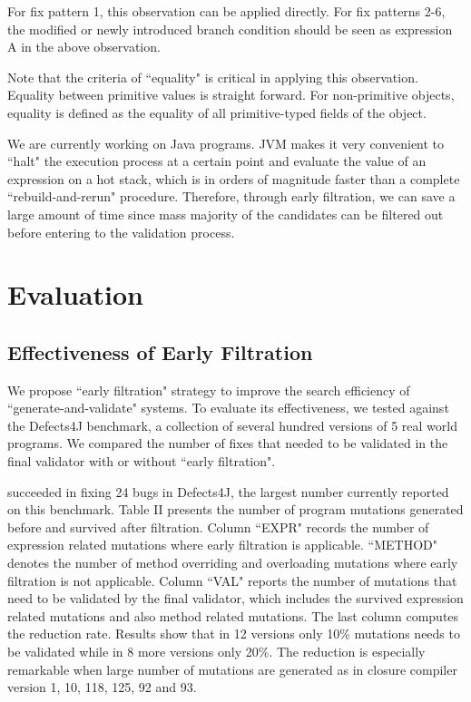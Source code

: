 For fix pattern 1, this observation can be applied directly. For fix patterns 2-6, the modified or newly introduced branch condition should be seen as expression A in the above observation.

Note that the criteria of ``equality" is critical in applying this observation. Equality between primitive values is straight forward. For non-primitive objects, equality is defined as the equality of all primitive-typed fields of the object.

We are currently working on Java programs. JVM makes it very convenient to ``halt" the execution process at a certain point and evaluate the value of an expression on a hot stack, which is in orders of magnitude faster than a complete ``rebuild-and-rerun" procedure. Therefore, through early filtration, we can save a large amount of time since mass majority of the candidates can be filtered out before entering to the validation process.
\section{Evaluation}

\subsection{Effectiveness of Early Filtration}
We propose ``early filtration" strategy to improve the search efficiency of ``generate-and-validate" systems. To evaluate its effectiveness, we tested \SmartDebug against the Defects4J\cite{Just:2014:DDE:2610384.2628055}
benchmark, a collection of several hundred versions of 5 real world programs. We compared the number of fixes that needed to be validated in the final validator with or without ``early filtration".

\SmartDebug succeeded in fixing 24 bugs in Defects4J, the largest number currently reported on this benchmark. Table II presents the number of program mutations generated before and survived after filtration. Column ``EXPR" records the number of expression related mutations where early filtration is applicable. ``METHOD" denotes the number of method overriding and overloading mutations where early filtration is not applicable. Column ``VAL" reports the number of mutations that need to be validated by the final validator, which includes the survived expression related mutations and also method related mutations. The last column computes the reduction rate. Results show that in 12 versions only 10\% mutations needs to be validated while in 8 more versions only 20\%. The reduction is especially remarkable when large number of mutations are generated as in closure compiler version 1, 10, 118, 125, 92 and 93.

